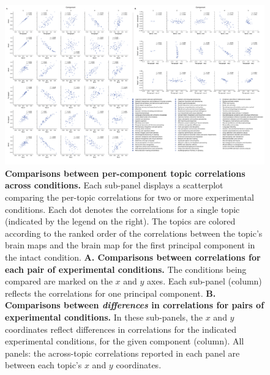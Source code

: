 \documentclass[english]{article}
\begin{document}
\begin{figure}[t]
  \centering
  \includegraphics[width=\textwidth]{figs/topic_contrasts}

\caption{\textbf{Comparisons between per-component topic correlations across conditions.}  Each sub-panel displays a scatterplot comparing the per-topic correlations for two or more experimental conditions.
Each dot denotes the correlations for a single topic (indicated by the legend on the right).  The topics are colored according to the ranked order of the correlations
between the topic's brain maps and the brain map for the first principal component in the intact condition.  \textbf{A. Comparisons between correlations for each pair of experimental conditions.}  The
conditions being compared are marked on the $x$ and $y$ axes.  Each sub-panel (column) reflects the correlations for one principal component.  \textbf{B. Comparisons between \textit{differences} in correlations for pairs of experimental conditions.}
In these sub-panels, the $x$ and $y$ coordinates reflect differences in correlations for the indicated experimental conditions, for the given component (column).
All panels: the across-topic correlations reported in each panel are between each topic's $x$ and $y$ coordinates.}

\label{fig:contrasts}

\end{figure}
\end{document}
